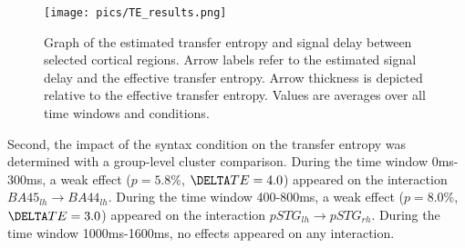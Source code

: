\begin{figure}[h]
\begin{center}
\vspace{7mm}
\texttt{[image: pics/TE\_results.png]}
\caption{\label{4.4.networkgraph} Graph of the estimated transfer entropy and signal delay between selected cortical regions. Arrow labels refer to the estimated signal delay and the effective transfer entropy. Arrow thickness is depicted relative to the effective transfer entropy. Values are averages over all time windows and conditions.}
\end{center}
\end{figure}

Second, the impact of the syntax condition on the transfer entropy was determined with a group-level cluster comparison.
During the time window 0ms-300ms, a weak effect ($p = 5.8\%$, $\DELTA TE = 4.0$) appeared on the interaction $BA45_{lh} \rightarrow BA44_{lh}$.
During the time window 400-800ms, a weak effect ($p = 8.0\%$, $\DELTA TE = 3.0$) appeared on the interaction $pSTG_{lh} \rightarrow pSTG_{rh}$.
During the time window 1000ms-1600ms, no effects appeared on any interaction.
